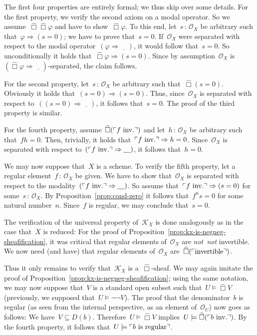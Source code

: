 \documentclass[10pt,reqno,a4paper]{amsbook}
\makeatletter
\theoremstyle{definition}
\theoremstyle{plain}
\theoremstyle{remark}
\renewcommand{\O}{\mathcal{O}}
\newcommand{\K}{\mathcal{K}}
\newcommand{\placeholder}{\underline{\quad}}
\newcommand{\?}{\,{:}\,}
\renewcommand{\_}{\mathpunct{.}\,}
\newcommand{\speak}[1]{\ulcorner\text{\textnormal{#1}}\urcorner}
\newcommand{\sdense}{{\widehat\Box}}
\newcommand{\inv}{inv.\@}
\newcommand{\notnot}{\emph{not~not}\xspace}
\renewenvironment{proof}[1][\proofname]{\par
  \pushQED{\qed}%
  \normalfont \topsep6\p@\@plus6\p@\relax
  \trivlist
  \item[\hskip\labelsep
        \itshape
    #1\@addpunct{.}]\ignorespaces
}{%
  \popQED\endtrivlist\@endpefalse
}
\makeatother
\begin{document}
\begin{proof}The first four properties are entirely formal; we thus skip over
some details. For the first property, we verify the second axiom on a modal
operator. So we assume~$\sdense\sdense\varphi$ and have to show~$\sdense\varphi$. To
this end, let~$s\?\O_X$ be arbitrary such that~$\varphi \Rightarrow (s=0)$; we
have to prove that~$s = 0$. If~$\O_X$ were separated with respect to the modal
operator~$(\varphi \Rightarrow \placeholder)$, it would follow that~$s = 0$. So
unconditionally it holds that~$\sdense\varphi \Rightarrow (s=0)$. Since by
assumption~$\O_X$ is~$(\sdense\varphi \Rightarrow \placeholder)$-separated, the claim follows.

For the second property, let~$s\?\O_X$ be arbitrary such that~$\sdense(s = 0)$.
Obviously it holds that~$(s = 0) \Rightarrow (s = 0)$. Thus, since~$\O_X$ is
separated with respect to~$((s = 0) \Rightarrow \placeholder)$, it follows
that~$s = 0$. The proof of the third property is similar.

For the fourth property, assume~$\sdense(\speak{$f$ \inv})$ and let~$h\?\O_X$ be
arbitrary such that~$fh = 0$. Then, trivially, it holds that~$\speak{$f$ \inv}
\Rightarrow h = 0$. Since~$\O_X$ is separated with respect to~$(\speak{$f$
\inv} \Rightarrow \placeholder)$, it follows that~$h = 0$.

We may now suppose that~$X$ is a scheme. To verify the fifth property, let a
regular element~$f\?\O_X$ be given. We have to show that~$\O_X$ is separated
with respect to the modality~$(\speak{$f$ \inv} \Rightarrow \placeholder)$. So
assume that~$\speak{$f$ \inv} \Rightarrow (s = 0)$ for some~$s\?\O_X$. By
Proposition~\ref{prop:cond-zero} it follows that~$f^n s = 0$ for some natural
number~$n$. Since~$f$ is regular, we may conclude that~$s = 0$.

The verification of the universal property of~$\K_X$ is done analogously as in
the case that~$X$ is reduced: For the proof of
Proposition~\ref{prop:kx-is-negneg-sheafification}, it was critical that
regular elements of~$\O_X$ are \notnot invertible. We now need (and have) that
regular elements of~$\O_X$ are~$\sdense(\speak{invertible})$.

Thus it only remains to verify that~$\K_X$ is a~$\sdense$-sheaf. We may again imitate
the proof of Proposition~\ref{prop:kx-is-negneg-sheafification}; using the same
notation, we may now suppose that~$V$ is a standard open subset such that~$U \models \sdense
V$ (previously, we supposed that~$U \models \neg\neg V$). The proof that the
denominator~$b$ is regular (as seen from the internal perspective, as an
element of~$\O_U$) now goes as follows: We have~$V \subseteq
D(b)$. Therefore~$U \models \sdense V$ implies~$U \models \sdense(\speak{$b$ \inv})$. By
the fourth property, it follows that~$U \models \speak{$b$ is regular}$.
\end{proof}
\end{document}
